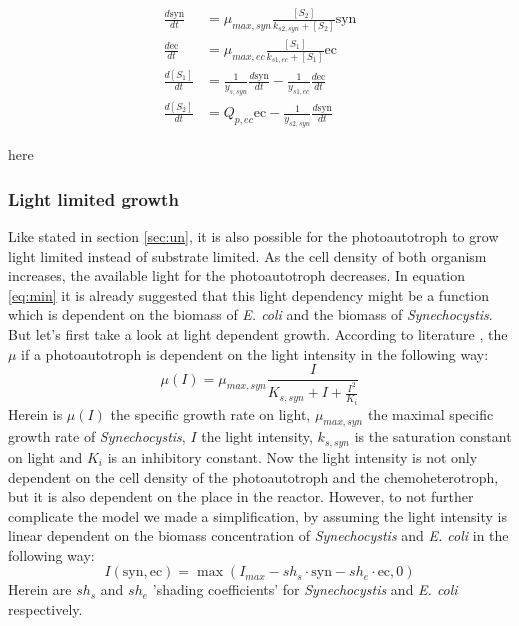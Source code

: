 \documentclass[10pt]{report}
\begin{document}
\begin{align} \label{eq:sd2}
 \frac{d\text{syn}}{dt} &= \mu_{max,syn} \frac{[S_2]}{k_{s2,syn}+[S_2]} \text{syn} \\
 \frac{d\text{ec}}{dt} &= \mu_{max,ec} \frac{[S_1]}{k_{s1,ec}+[S_1]} \text{ec} \\
 \frac{d[S_1]}{dt} &= \frac{1}{y_{s,syn}} \frac{d\text{syn}}{dt} - \frac{1}{y_{s1,ec}} \frac{d\text{ec}}{dt} \\
 \frac{d[S_2]}{dt} &=  Q_{p,ec} \text{ec} - \frac{1}{y_{s2,syn}} \frac{d\text{syn}}{dt}
\end{align}

here
\subsubsection{Light limited growth}
Like stated in section \ref{sec:un}, it is also possible for the photoautotroph to grow light limited instead of substrate limited. As the cell density of both organism increases, the available light for the photoautotroph decreases. In equation \ref{eq:min} it is already suggested that this light dependency might be a function which is dependent on the biomass of \textit{E. coli} and the biomass of \textit{Synechocystis}. But let's first take a look at light dependent growth.
According to literature \cite{franco2006model}, the $\mu$ if a photoautotroph is dependent on the light intensity in the following way:
\begin{equation}
 \mu(I) = \mu_{max,syn}\frac{I}{K_{s,syn}+I+\frac{I^{2}}{K_{i}}}
\end{equation}
Herein is $\mu(I)$ the specific growth rate on light, $\mu_{max,syn}$ the maximal specific growth rate of \textit{Synechocystis}, $I$ the light intensity, $k_{s,syn}$ is the saturation constant on light and $K_{i}$ is an inhibitory constant.
Now the light intensity is not only dependent on the cell density of the photoautotroph and the chemoheterotroph, but it is also dependent on the place in the reactor. However, to not further complicate the model we made a simplification, by assuming the light intensity is linear dependent on the biomass concentration of \textit{Synechocystis} and \textit{E. coli} in the following way:
\begin{equation} \label{eq:I}
 I(\text{syn}, \text{ec}) = \max(I_{max}-sh_{s}\cdot\text{syn}-sh_{e}\cdot\text{ec},0)
\end{equation}
Herein are $sh_{s}$ and $sh_{e}$ 'shading coefficients' for \textit{Synechocystis} and \textit{E. coli} respectively.
\end{document}
